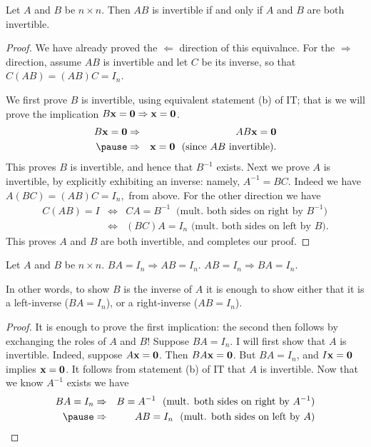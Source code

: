 \begin{frame}\footnotesize
\begin{corollary}
Let $A$ and $B$ be $n\times n$. Then $AB$ is invertible if and only if  $A$ and $B$ are both invertible. 
\end{corollary}
\pause
\begin{proof}
We have already proved the $\Leftarrow$ direction of this equivalnce. 
\bpause
For the $\Rightarrow$ direction, assume $AB$ is invertible and let $C$ be its inverse, so that $C(AB)=(AB)C=I_n$. 

We first prove $B$ is invertible, using equivalent statement (b) of IT; that is we will prove the implication 
$
B{\mathbf x}={\mathbf 0}\Rightarrow {\mathbf x}={\mathbf 0}$. \pause
\begin{eqnarray*}
B\boldx=\boldzero&\Rightarrow & AB\boldx=\boldzero\\
\pause&\Rightarrow& \boldx=\boldzero \ \text{ (since $AB$ invertible)}.
\end{eqnarray*} 
This proves $B$ is invertible, and hence that $B^{-1}$ exists.
\bpause 
Next we prove $A$ is invertible, by explicitly exhibiting an inverse: namely, $A^{-1}=BC$. 
\bpause Indeed we have 
$
A(BC)=(AB)C=I_n,
$
from above. \pause For the other direction we have 
\begin{eqnarray*}
C(AB)=I&\Leftrightarrow& CA=B^{-1} \ \text{ (mult. both sides on right by $B^{-1}$)}\\
&\Leftrightarrow& (BC)A=I_n \text{ (mult. both sides on left by $B$)}.
\end{eqnarray*}
This proves $A$ and $B$ are both invertible, and completes our proof. 
\end{proof}

\end{frame}
\begin{frame}\footnotesize
\begin{corollary}
Let $A$ and $B$ be $n\times n$. 
\bb[(i)]
\ii $BA=I_n\Rightarrow AB=I_n$.
\ii $AB=I_n\Rightarrow BA=I_n$. 
\ee
\end{corollary}
In other words, to show $B$ is the inverse of $A$ it is enough to show either that it is a left-inverse ($BA=I_n$), or a right-inverse ($AB=I_n$). 
\pause
\begin{proof}
It is enough to prove the first implication: the second then follows by exchanging the roles of $A$ and $B$! 
\bpause
Suppose $BA=I_n$. I will first show that $A$ is invertible. Indeed, suppose $A{\mathbf x}={\mathbf 0}$. Then $BA{\mathbf x}={\mathbf 0}$. But $BA=I_n$, and $I{\mathbf x}={\mathbf 0}$ implies ${\mathbf x}={\mathbf 0}$. It follows from statement (b) of IT that $A$ is invertible. 
\bpause 
Now that we know $A^{-1}$ exists we have 
\begin{eqnarray*}
BA=I_n&\Rightarrow & B=A^{-1} \ \text{ (mult. both sides on right by $A^{-1}$)}\\
\pause&\Rightarrow &AB=I_n \ \text{ (mult. both sides on left by $A$)}
\end{eqnarray*}  
\end{proof}
\end{frame}
